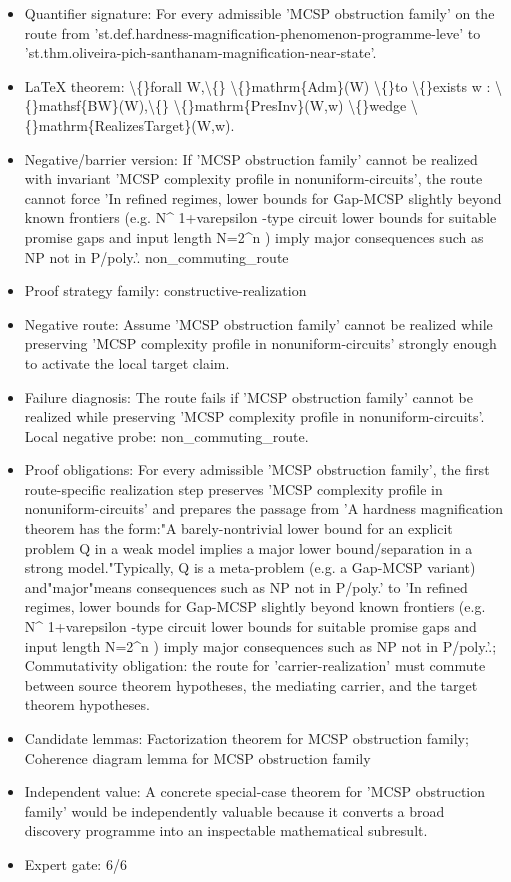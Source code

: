 \documentclass[11pt]{article}
\begin{document}
\begin{itemize}
\item Quantifier signature: For every admissible 'MCSP obstruction family' on the route from 'st.def.hardness-magnification-phenomenon-programme-leve' to 'st.thm.oliveira-pich-santhanam-magnification-near-state'.
\item LaTeX theorem: \textbackslash\{\}forall W,\textbackslash\{\} \textbackslash\{\}mathrm\{Adm\}(W) \textbackslash\{\}to \textbackslash\{\}exists w : \textbackslash\{\}mathsf\{BW\}(W),\textbackslash\{\} \textbackslash\{\}mathrm\{PresInv\}(W,w) \textbackslash\{\}wedge \textbackslash\{\}mathrm\{RealizesTarget\}(W,w).
\item Negative/barrier version: If 'MCSP obstruction family' cannot be realized with invariant 'MCSP complexity profile in nonuniform-circuits', the route cannot force 'In refined regimes, lower bounds for Gap-MCSP slightly beyond known frontiers (e.g. N\textasciicircum{} 1+varepsilon -type circuit lower bounds for suitable promise gaps and input length N=2\textasciicircum{}n ) imply major consequences such as NP not in P/poly.'. non\_commuting\_route
\item Proof strategy family: constructive-realization
\item Negative route: Assume 'MCSP obstruction family' cannot be realized while preserving 'MCSP complexity profile in nonuniform-circuits' strongly enough to activate the local target claim.
\item Failure diagnosis: The route fails if 'MCSP obstruction family' cannot be realized while preserving 'MCSP complexity profile in nonuniform-circuits'. Local negative probe: non\_commuting\_route.
\item Proof obligations: For every admissible 'MCSP obstruction family', the first route-specific realization step preserves 'MCSP complexity profile in nonuniform-circuits' and prepares the passage from 'A hardness magnification theorem has the form:"A barely-nontrivial lower bound for an explicit problem Q in a weak model implies a major lower bound/separation in a strong model."Typically, Q is a meta-problem (e.g. a Gap-MCSP variant) and"major"means consequences such as NP not in P/poly.' to 'In refined regimes, lower bounds for Gap-MCSP slightly beyond known frontiers (e.g. N\textasciicircum{} 1+varepsilon -type circuit lower bounds for suitable promise gaps and input length N=2\textasciicircum{}n ) imply major consequences such as NP not in P/poly.'.; Commutativity obligation: the route for 'carrier-realization' must commute between source theorem hypotheses, the mediating carrier, and the target theorem hypotheses.
\item Candidate lemmas: Factorization theorem for MCSP obstruction family; Coherence diagram lemma for MCSP obstruction family
\item Independent value: A concrete special-case theorem for 'MCSP obstruction family' would be independently valuable because it converts a broad discovery programme into an inspectable mathematical subresult.
\item Expert gate: 6/6
\end{itemize}
\end{document}
